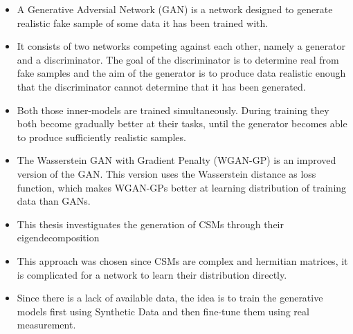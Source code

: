 \documentclass[12pt,pdftex,16x10]{elpres} %
\begin{document}
\begin{psli}
  \begin{itemize}
    \item A Generative Adversial Network (GAN) is a network designed to generate realistic fake sample of some data it has been trained with.
    \item It consists of two networks competing against each other, namely a generator and a discriminator. The goal of the discriminator is to determine real from fake samples and the aim of the generator is to produce data realistic enough that the discriminator cannot determine that it has been generated.
    \item Both those inner-models are trained simultaneously. During training they both become gradually better at their tasks, until the generator becomes able to produce sufficiently realistic samples.
    \item The Wasserstein GAN with Gradient Penalty (WGAN-GP) is an improved version of the GAN. This version uses the  Wasserstein distance as loss function, which makes WGAN-GPs better at learning distribution of training data than GANs.  
  \end{itemize}
\end{psli}



\begin{psli}
  \begin{itemize}
    \item This thesis investiguates the generation of CSMs through their eigendecomposition
    \item This approach was chosen since CSMs are complex and hermitian matrices, it is complicated for a network to learn their distribution directly.
    \item Since there is a lack of available data, the idea is to train the generative models first using Synthetic Data and then fine-tune them using real measurement.
  \end{itemize}
\end{psli}
\end{document}
